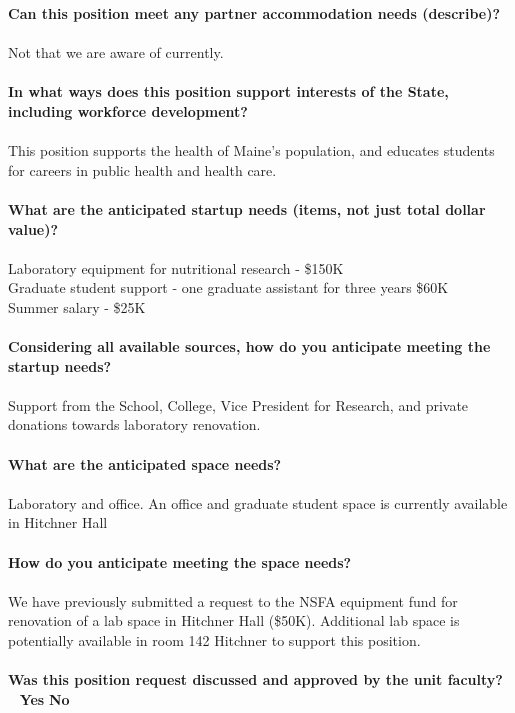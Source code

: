 \documentclass[11pt]{article}
\begin{document}
\vfill
\noindent\textbf{\rmfamily Can this position meet any partner accommodation needs (describe)?}
\\~\\Not that we are aware of currently.\\~\\
\vfill
\noindent\textbf{\rmfamily In what ways does this position support interests of the State, including workforce development?}\\~\\
This position supports the health of Maine's population, and educates students for careers in public health and health care.
\\~\\
\vfill
\newpage\noindent\textbf{\rmfamily What are the anticipated startup needs (items, not just total dollar value)?}\\~\\
Laboratory equipment for nutritional research - \$150K \\
Graduate student support - one graduate assistant for three years \$60K\\
Summer salary - \$25K\\~\\
\vfill
\noindent\textbf{\rmfamily Considering all available sources, how do you anticipate meeting the startup needs?}\\~\\
Support from the School, College, Vice President for Research, and private donations towards laboratory renovation.\\~\\
\vfill
\noindent\textbf{\rmfamily What are the anticipated space needs?}\\~\\ Laboratory and office. An office and graduate student space is currently available in Hitchner Hall\\~\\
\vfill
\noindent\textbf{\rmfamily How do you anticipate meeting the space needs?} \\~\\
We have previously submitted a request to the NSFA equipment fund for renovation of a lab space in Hitchner Hall (\$50K). Additional lab space is potentially available in room 142 Hitchner to support this position.\\~\\
\vfill
\noindent\textbf{\rmfamily Was this position request discussed and approved by the unit faculty?} \hfill ~ \hfill \textbf{\Large{\HollowBox} \normalsize{Yes}} \hfill \textbf{\Large{\HollowBox} \normalsize{ No}}\\~\\%
\end{document}
